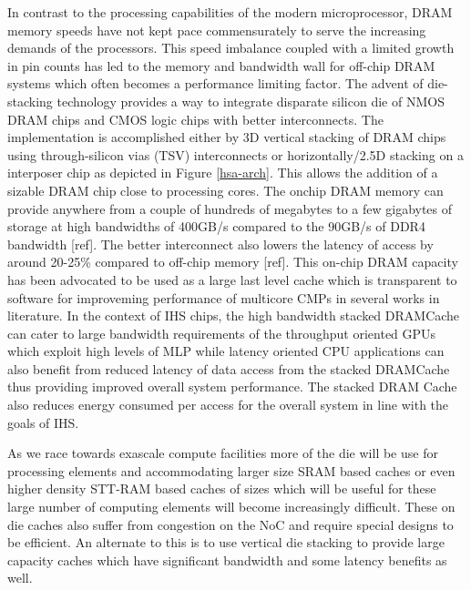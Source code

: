 \par In contrast to the processing capabilities of the modern microprocessor, DRAM memory speeds have not kept pace commensurately to serve the increasing demands of the processors. This speed imbalance coupled with a limited growth in pin counts has led to the memory \cite{memory-wall} and bandwidth \cite{bandwidth-wall} wall for off-chip DRAM systems which often becomes a performance limiting factor. The advent of die-stacking technology \cite{3d-stacking} provides a way to integrate disparate silicon die of NMOS DRAM chips and CMOS logic chips with better interconnects. The implementation is accomplished either by 3D vertical stacking of DRAM chips using through-silicon vias (TSV) interconnects or horizontally/2.5D stacking on a interposer chip as depicted in Figure \ref{hsa-arch}. This allows the addition of a sizable DRAM chip close to processing cores. The onchip DRAM memory can provide anywhere from a couple of hundreds of megabytes to a few gigabytes of storage at high bandwidths of 400GB/s compared to the 90GB/s of DDR4 bandwidth [ref]. The better interconnect also lowers the latency of access by around 20-25\% compared to off-chip memory [ref]. This on-chip DRAM capacity has been advocated to be used as a large last level cache which is transparent to software for improveming performance of multicore CMPs in several works in literature. In the context of IHS chips, the high bandwidth stacked DRAMCache can cater to large bandwidth requirements of the throughput oriented GPUs which exploit high levels of MLP while latency oriented CPU applications can also benefit from reduced latency of data access from the stacked DRAMCache thus providing improved overall system performance. The stacked DRAM Cache also reduces energy consumed per access for the overall system in line with the goals of IHS.
\par As we race towards exascale compute facilities more of the die will be use for processing elements and accommodating larger size SRAM based caches or even higher density STT-RAM based caches \cite{oscar} of sizes which will be useful for these large number of computing elements will become increasingly difficult. These on die caches also suffer from congestion on the NoC and require special designs to be efficient. An alternate to this is to use vertical die stacking to provide large capacity caches which have significant bandwidth and some latency benefits as well.
